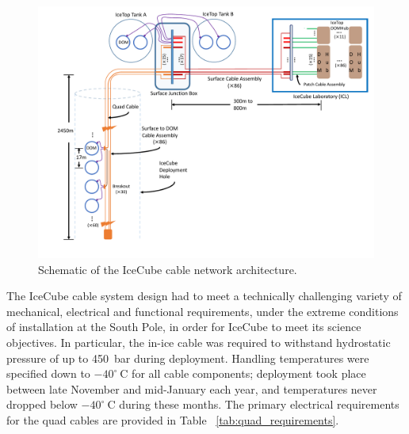 \begin{figure}
  \centering
  \includegraphics[width=\textwidth]{graphics/cables/cable_system_schematic.pdf}
  \caption{\label{fig:icecube-cables-logical}Schematic of the IceCube cable network architecture.}
\end{figure}

The IceCube cable system design had to meet a technically challenging
variety of mechanical, electrical and functional requirements, under the extreme
conditions of installation at the South Pole, in order for
IceCube to meet its science objectives.  In particular, the in-ice cable
was required to withstand hydrostatic pressure of up to 450~bar during
deployment.  Handling temperatures were specified down to $-40^{\circ}\ \mathrm{C}$ for all 
cable components; deployment took place between late November and
mid-January each year, and temperatures never dropped below
$-40^{\circ}\ \mathrm{C}$ during these months.  The primary electrical requirements for the quad
cables are provided in Table ~\ref{tab:quad_requirements}.


